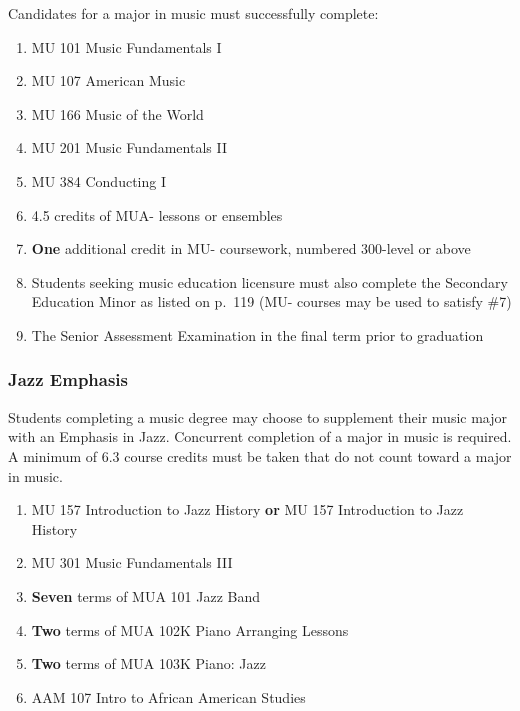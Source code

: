 \documentclass[
  letterpaper,
]{scrbook}
\providecommand{\tightlist}{%
  \setlength{\itemsep}{0pt}\setlength{\parskip}{0pt}}
\begin{document}
Candidates for a major in music must successfully complete:

\begin{enumerate}
\def\labelenumi{\arabic{enumi}.}
\tightlist
\item
  MU 101 Music Fundamentals I\\
\item
  MU 107 American Music\\
\item
  MU 166 Music of the World\\
\item
  MU 201 Music Fundamentals II\\
\item
  MU 384 Conducting I\\
\item
  4.5 credits of MUA- lessons or ensembles\\
\item
  \textbf{One} additional credit in MU- coursework, numbered 300-level
  or above\\
\item
  Students seeking music education licensure must also complete the
  Secondary Education Minor as listed on p.~119 (MU- courses may be used
  to satisfy \#7)\\
\item
  The Senior Assessment Examination in the final term prior to
  graduation
\end{enumerate}

\subsubsection{Jazz Emphasis}\label{jazz-emphasis}

Students completing a music degree may choose to supplement their music
major with an Emphasis in Jazz. Concurrent completion of a major in
music is required. A minimum of 6.3 course credits must be taken that do
not count toward a major in music.

\begin{enumerate}
\def\labelenumi{\arabic{enumi}.}
\tightlist
\item
  MU 157 Introduction to Jazz History \textbf{or} MU 157 Introduction to
  Jazz History\\
\item
  MU 301 Music Fundamentals III\\
\item
  \textbf{Seven} terms of MUA 101 Jazz Band\\
\item
  \textbf{Two} terms of MUA 102K Piano Arranging Lessons\\
\item
  \textbf{Two} terms of MUA 103K Piano: Jazz\\
\item
  AAM 107 Intro to African American Studies
\end{enumerate}
\end{document}
